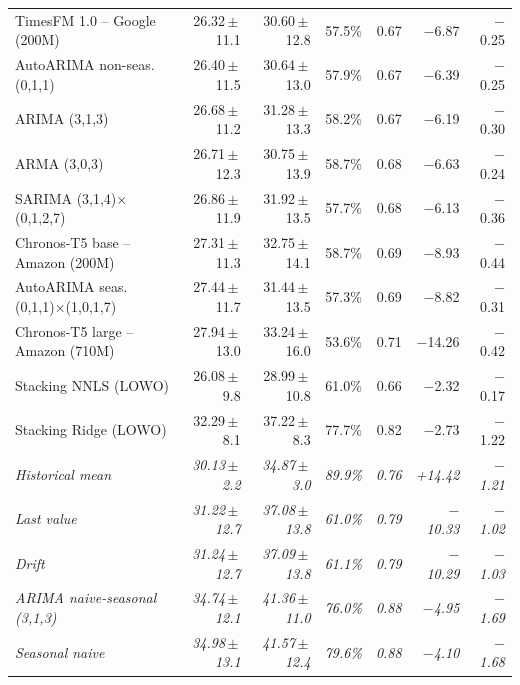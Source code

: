 \begin{table}[!htbp]
{\begin{tabular}{@{}lrrrrrr@{}}
TimesFM 1.0 -- Google (200M)              & 26.32\,$\pm$\,11.1          & 30.60\,$\pm$\,12.8            & 57.5\% & 0.67          & $-$6.87  & $-$0.25 \\
AutoARIMA non-seas. (0,1,1)               & 26.40\,$\pm$\,11.5          & 30.64\,$\pm$\,13.0            & 57.9\% & 0.67          & $-$6.39  & $-$0.25 \\
ARIMA (3,1,3)                             & 26.68\,$\pm$\,11.2          & 31.28\,$\pm$\,13.3            & 58.2\% & 0.67          & $-$6.19  & $-$0.30 \\
ARMA (3,0,3)                              & 26.71\,$\pm$\,12.3          & 30.75\,$\pm$\,13.9            & 58.7\% & 0.68          & $-$6.63  & $-$0.24 \\
SARIMA (3,1,4)$\times$(0,1,2,7)           & 26.86\,$\pm$\,11.9          & 31.92\,$\pm$\,13.5            & 57.7\% & 0.68          & $-$6.13  & $-$0.36 \\
Chronos-T5 base -- Amazon (200M)          & 27.31\,$\pm$\,11.3          & 32.75\,$\pm$\,14.1            & 58.7\% & 0.69          & $-$8.93  & $-$0.44 \\
AutoARIMA seas. (0,1,1)$\times$(1,0,1,7)  & 27.44\,$\pm$\,11.7          & 31.44\,$\pm$\,13.5            & 57.3\% & 0.69          & $-$8.82  & $-$0.31 \\
Chronos-T5 large -- Amazon (710M)         & 27.94\,$\pm$\,13.0          & 33.24\,$\pm$\,16.0            & 53.6\% & 0.71          & $-$14.26 & $-$0.42 \\
\midrule
Stacking NNLS (LOWO)                      & 26.08\,$\pm$\,9.8           & 28.99\,$\pm$\,10.8            & 61.0\% & 0.66          & $-$2.32  & $-$0.17 \\
Stacking Ridge (LOWO)                     & 32.29\,$\pm$\,8.1           & 37.22\,$\pm$\,8.3             & 77.7\% & 0.82          & $-$2.73  & $-$1.22 \\
\midrule
\textit{Historical mean}                  & \textit{30.13\,$\pm$\,2.2}  & \textit{34.87\,$\pm$\,3.0}    & \textit{89.9\%} & \textit{0.76} & \textit{+14.42} & \textit{$-$1.21} \\
\textit{Last value}                       & \textit{31.22\,$\pm$\,12.7} & \textit{37.08\,$\pm$\,13.8}   & \textit{61.0\%} & \textit{0.79} & \textit{$-$10.33} & \textit{$-$1.02} \\
\textit{Drift}                            & \textit{31.24\,$\pm$\,12.7} & \textit{37.09\,$\pm$\,13.8}   & \textit{61.1\%} & \textit{0.79} & \textit{$-$10.29} & \textit{$-$1.03} \\
\textit{ARIMA naive-seasonal (3,1,3)}     & \textit{34.74\,$\pm$\,12.1} & \textit{41.36\,$\pm$\,11.0}   & \textit{76.0\%} & \textit{0.88} & \textit{$-$4.95}  & \textit{$-$1.69} \\
\textit{Seasonal naive}                   & \textit{34.98\,$\pm$\,13.1} & \textit{41.57\,$\pm$\,12.4}   & \textit{79.6\%} & \textit{0.88} & \textit{$-$4.10}  & \textit{$-$1.68} \\
\bottomrule
\end{tabular}}
\end{table}

